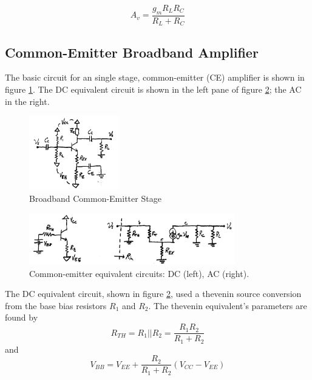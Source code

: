 \documentclass[titlepage, letterpaper, 11pt]{article}
\begin{document}
\begin{equation}
A_{v}=\frac{g_{m}R_{L}R_{C}}{R_{L}+R_{C}}
\label{cbAv}
\end{equation}

\subsection{Common-Emitter Broadband Amplifier}

The basic circuit for an single stage, common-emitter (CE)
amplifier is shown in figure \ref{commonEmitterAmplifier}.
The DC equivalent circuit is shown in the left pane of figure
\ref{commonEmitterEquivalentCircuits}; the AC in the right.

\begin{figure}[ht]
	\centering
	\includegraphics[width=0.35\textwidth]
		{figures/commonEmitterAmplifier.png}
	\caption{
		Broadband Common-Emitter Stage
	}
	\label{commonEmitterAmplifier}
\end{figure}

\begin{figure}[ht]
	\centering
	\includegraphics[width=0.8\textwidth]
		{figures/commonEmitterEquivalentCircuits}
	\caption{
		Common-emitter equivalent circuits: DC (left),
		AC (right).
	}
	\label{commonEmitterEquivalentCircuits}
\end{figure}

The DC equivalent circuit, shown in figure
\ref{commonEmitterEquivalentCircuits}, used a thevenin source
conversion from the base bias resistors $R_{1}$ and $R_{2}$. The
thevenin equivalent's parameters are found by
\begin{equation}
R_{TH}=R_{1}||R_{2}=\frac{R_{1}R_{2}}{R_{1}+R_{2}}
\end{equation}
and
\begin{equation}
V_{BB}=V_{EE}+\frac{R_{2}}{R_{1}+R_{2}}(V_{CC}-V_{EE})
\end{equation}
\end{document}

